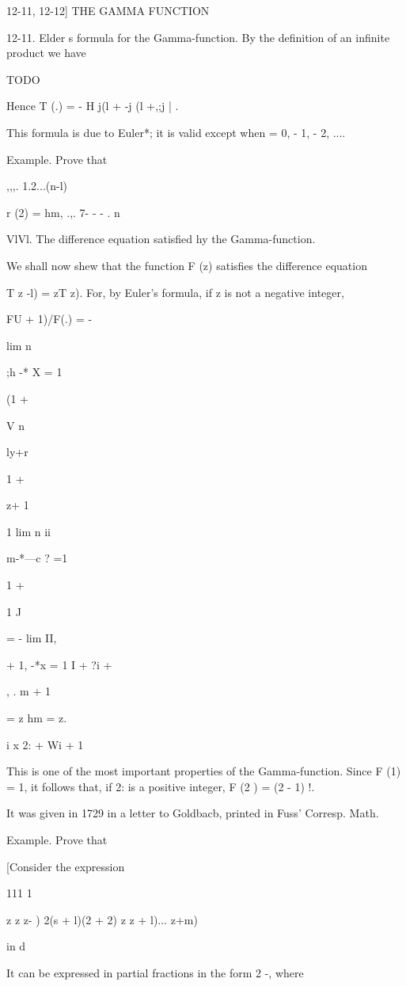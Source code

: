 12-11, 12-12] THE GAMMA FUNCTION

12-11. Elder s formula for the Gamma-function. By the definition of an
infinite product we have

TODO

Hence T (.) = - H j(l + -j (l +,;j | .

This formula is due to Euler*; it is valid except when = 0, - 1, - 2,
....

Example. Prove that

,,,. 1.2...(n-l)

r (2) = hm, .,. 7- - - . n\


VlVl. The difference equation satisfied hy the Gamma-function.

We shall now shew that the function F (z) satisfies the difference
equation

T z -l) = zT z). For, by Euler's formula, if z is not a negative
integer,

FU + 1)/F(.) = -

lim n

;h -* X = 1

(1 +

V n

ly+r

1 +

z+ 1

1 lim n ii

m-*---c ? =1

1 +

1 J

= - lim II,

  + 1, -*x = 1 I + ?i +

, . m + 1

= z hm = z.

 i x 2: + Wi + 1

This is one of the most important properties of the Gamma-function.
Since F (1) = 1, it follows that, if 2: is a positive integer, F (2 )
= (2 - 1) !.

It was given in 1729 in a letter to Goldbacb, printed in Fuss'
Corresp. Math.

%
%

Example. Prove that

[Consider the expression

111 1

z z z- ) 2(s + l)(2 + 2) z z + l)... z+m)

in d

It can be expressed in partial fractions in the form 2 -, where

